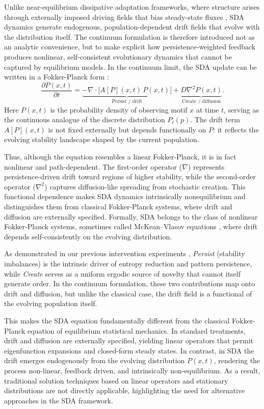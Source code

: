 \documentclass{artificial-life}
\let\cite\citep
\begin{document}
Unlike near-equilibrium dissipative adaptation frameworks, where structure arises through externally imposed driving fields that bias steady-state fluxes \cite{england2015dissipative}, SDA dynamics generate endogenous, population-dependent drift fields that evolve with the distribution itself. The continuum formulation is therefore introduced not as an analytic convenience, but to make explicit how persistence-weighted feedback produces nonlinear, self-consistent evolutionary dynamics that cannot be captured by equilibrium models. In the continuum limit, the SDA update can be written in a Fokker-Planck form \cite{gardiner2009}:
\begin{equation}
\frac{\partial P(x,t)}{\partial t}
= \underbrace{- \nabla \cdot \big[ A[P](x,t)\, P(x,t) \big]}_{\text{Persist / drift}}
+ \underbrace{D \nabla^2 P(x,t)}_{\text{Create / diffusion}}.
\end{equation}
Here $P(x,t)$ is the probability density of observing motif $x$ at time $t$, 
serving as the continuous analogue of the discrete distribution $P_t(p)$. 
The drift term $A[P](x,t)$ is not fixed externally but depends functionally on $P$: 
it reflects the evolving stability landscape shaped by the current population. 

Thus, although the equation resembles a linear Fokker-Planck, it is in fact nonlinear and path-dependent. 
The first-order operator ($\nabla$) represents persistence-driven drift toward regions of higher stability, 
while the second-order operator ($\nabla^2$) captures diffusion-like spreading from stochastic creation. 
This functional dependence makes SDA dynamics intrinsically nonequilibrium and distinguishes them from 
classical Fokker-Planck systems, where drift and diffusion are externally specified. 
Formally, SDA belongs to the class of nonlinear Fokker-Planck systems, sometimes called McKean--Vlasov equations \cite{mckean1966, villani2009}, 
where drift depends self-consistently on the evolving distribution.  

As demonstrated in our previous intervention experiments \cite{adler_sda}, 
\textit{Persist} (stability imbalances) is the intrinsic driver of entropy
reduction and pattern persistence, while \textit{Create} serves as a uniform ergodic source of novelty that cannot itself generate order.  
In the continuum formulation, these two contributions map onto drift and diffusion, 
but unlike the classical case, the drift field is a functional of the evolving
population itself.  

This makes the SDA equation fundamentally different from the classical Fokker-Planck equation of equilibrium statistical mechanics. In standard treatments, 
drift and diffusion are externally specified, yielding linear operators that
permit eigenfunction expansions and closed-form steady states. In contrast,
in SDA the drift emerges endogenously from the evolving distribution $P(x,t)$, 
rendering the process non-linear, feedback driven, and intrinsically non-equilibrium.  
As a result, traditional solution techniques based on linear operators and
stationary distributions are not directly applicable, highlighting the need
for alternative approaches in the SDA framework.
\end{document}
